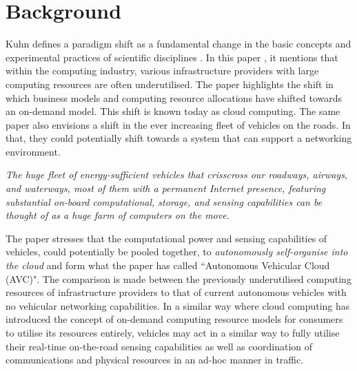 \section{Background}
Kuhn defines a paradigm shift as a fundamental change in the basic concepts and experimental practices of scientific disciplines \citep{Kuhn1970TheRevolutions}. In this paper \citep{Eltoweissy2010TowardsPaper}, it mentions that within the computing industry, various infrastructure providers with large computing resources are often underutilised. The paper highlights the shift in which business models and computing resource allocations have shifted towards an on-demand model. This shift is known today as cloud computing. The same paper also envisions a shift in the ever increasing fleet of vehicles on the roads. In that, they could potentially shift towards a system that can support a networking environment.

\begin{displayquote}
    \textit{The huge fleet of energy-sufficient vehicles that crisscross our roadways, airways, and waterways, most of them with a permanent Internet presence, featuring substantial on-board computational, storage, and sensing capabilities can be thought of as a huge farm of computers on the move.}
\end{displayquote}

The paper stresses that the computational power and sensing capabilities of vehicles, could potentially be pooled together, to \textit{autonomously self-organise into the cloud} and form what the paper has called ``Autonomous Vehicular Cloud (AVC)". The comparison is made between the previously underutilised computing resources of infrastructure providers to that of current autonomous vehicles with no vehicular networking capabilities. In a similar way where cloud computing has introduced the concept of on-demand computing resource models for consumers to utilise its resources entirely, vehicles may act in a similar way to fully utilise their real-time on-the-road sensing capabilities as well as coordination of communications and physical resources in an ad-hoc manner in traffic.